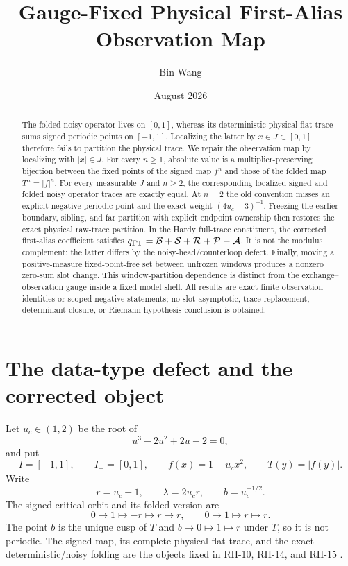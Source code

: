 \documentclass[11pt]{article}
\title{Gauge-Fixed Physical First-Alias Observation Map}
\author{Bin Wang}
\date{August 2026}
\theoremstyle{remark}
\newcommand{\cA}{\mathcal A}
\newcommand{\cB}{\mathcal B}
\newcommand{\cP}{\mathcal P}
\newcommand{\cR}{\mathcal R}
\newcommand{\cS}{\mathcal S}
\begin{document}
\maketitle

\begin{abstract}
The folded noisy operator lives on $[0,1]$, whereas its deterministic
physical flat trace sums signed periodic points on $[-1,1]$.  Localizing the
latter by $x\in J\subset[0,1]$ therefore fails to partition the physical
trace.  We repair the observation map by localizing with $|x|\in J$.  For
every $n\ge1$, absolute value is a multiplier-preserving bijection between
the fixed points of the signed map $f^n$ and those of the folded map
$T^n=|f|^n$.  For every measurable $J$ and $n\ge2$, the corresponding
localized signed and folded noisy operator traces are exactly equal.  At
$n=2$ the old convention misses an explicit negative periodic point and the
exact weight $(4u_c-3)^{-1}$.  Freezing the earlier boundary, sibling, and
far partition with explicit endpoint ownership then restores the exact physical raw-trace
partition.  In the Hardy full-trace constituent, the corrected first-alias
coefficient satisfies $q_{\rm FT}=\cB+\cS+\cR+\cP-\cA$.  It is not the
modulus complement: the latter differs by the noisy-head/counterloop defect.
Finally, moving a positive-measure fixed-point-free set between unfrozen
windows produces a nonzero zero-sum slot change.  This window-partition
dependence is distinct from the exchange--observation gauge inside a fixed
model shell.  All results are exact finite observation identities or scoped
negative statements; no slot asymptotic, trace replacement, determinant
closure, or Riemann-hypothesis conclusion is obtained.
\end{abstract}

\section{The data-type defect and the corrected object}

Let $u_c\in(1,2)$ be the root of
\begin{equation}\label{eq:cubic}
 u^3-2u^2+2u-2=0,
\end{equation}
and put
\begin{equation}\label{eq:map-data}
 I=[-1,1],\qquad I_+=[0,1],\qquad
 f(x)=1-u_cx^2,\qquad T(y)=|f(y)|.
\end{equation}
Write
\begin{equation}\label{eq:r-lambda-b}
 r=u_c-1,\qquad \lambda=2u_cr,\qquad b=u_c^{-1/2}.
\end{equation}
The signed critical orbit and its folded version are
\begin{equation}\label{eq:critical-orbits}
 0\mapsto1\mapsto-r\mapsto r\mapsto r,
 \qquad
 0\mapsto1\mapsto r\mapsto r.
\end{equation}
The point $b$ is the unique cusp of $T$ and
$b\mapsto0\mapsto1\mapsto r$ under $T$, so it is not periodic.  The signed
map, its complete physical flat trace, and the exact deterministic/noisy
folding are the objects fixed in RH-10, RH-14, and RH-15
\citep{WangLongCycle2026,WangParityBoundary2026,WangBulkScattering2026}.
\end{document}
